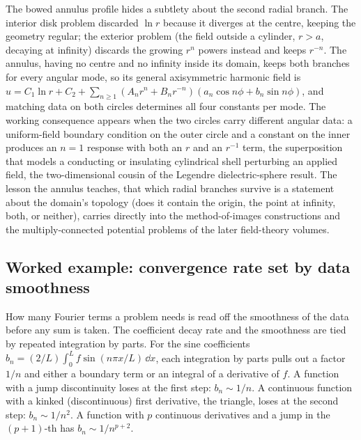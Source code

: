 

\begin{mastery}
The bowed annulus profile hides a subtlety about the second radial
branch. The interior disk problem discarded $\ln r$ because it
diverges at the centre, keeping the geometry regular; the exterior
problem (the field outside a cylinder, $r > a$, decaying at infinity)
discards the growing $r^{n}$ powers instead and keeps $r^{-n}$. The
annulus, having no centre and no infinity inside its domain, keeps
both branches for every angular mode, so its general axisymmetric
harmonic field is $u = C_{1}\ln r + C_{2} + \sum_{n\geq 1}
(A_{n}r^{n} + B_{n}r^{-n})(a_{n}\cos n\phi + b_{n}\sin n\phi)$, and
matching data on both circles determines all four constants per mode.
The working consequence appears when the two circles carry different
angular data: a uniform-field boundary condition on the outer circle
and a constant on the inner produces an $n = 1$ response with both an
$r$ and an $r^{-1}$ term, the superposition that models a conducting
or insulating cylindrical shell perturbing an applied field, the
two-dimensional cousin of the Legendre dielectric-sphere result. The
lesson the annulus teaches, that which radial branches survive is a
statement about the domain's topology (does it contain the origin, the
point at infinity, both, or neither), carries directly into the
method-of-images constructions and the multiply-connected potential
problems of the later field-theory volumes.
\end{mastery}

\subsection{Worked example: convergence rate set by data smoothness}

How many Fourier terms a problem needs is read off the smoothness
of the data before any sum is taken. The coefficient decay rate and
the smoothness are tied by repeated integration by parts. For the
sine coefficients $b_{n} = (2/L)\int_{0}^{L} f \sin(n\pi x/L)\,\dd
x$, each integration by parts pulls out a factor $1/n$ and either a
boundary term or an integral of a derivative of $f$. A function
with a jump discontinuity loses at the first step: $b_{n} \sim 1/n$.
A continuous function with a kinked (discontinuous) first
derivative, the triangle, loses at the second step: $b_{n} \sim
1/n^{2}$. A function with $p$ continuous derivatives and a jump in
the $(p{+}1)$-th has $b_{n} \sim 1/n^{p+2}$.

